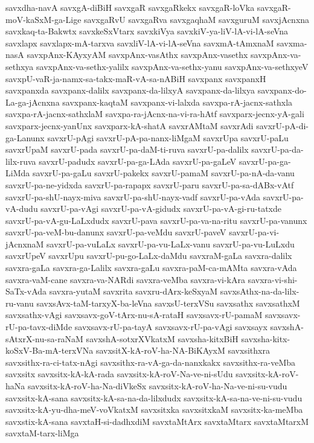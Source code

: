{savxdha-navA
savxgA-diBiH
savxgaR
savxgaRkekx
savxgaR-loVka
savxgaR-moV-kaSxM-ga-Lige
savxgaRvU
savxgaRva
savxgaqhaM
savxguruM
savxjAcnxna
savxkaq-ta-Bakwtx
savxkeSxVtarx
savxkiVya
savxkiV-ya-liV-lA-vi-lA-seVna
savxlapx
savxlapx-mA-tarxva
savxliV-lA-vi-lA-seVna
savxmA-tAmxnaM
savxma-nasA
savxpAnx-KAyxyAM
savxpAnx-vasAthx
savxpAnx-vasethx
savxpAnx-va-sethxya
savxpAnx-va-sethx-yalilx
savxpAnx-va-sethx-yanu
savxpAnx-va-sethxyeV
savxpU-vaR-ja-namx-sa-takx-maR-vA-sa-nABiH
savxpanx
savxpanxH
savxpanxda
savxpanx-dalilx
savxpanx-da-lilxyA
savxpanx-da-lilxya
savxpanx-do-La-ga-jAcnxna
savxpanx-kaqtaM
savxpanx-vi-lalxda
savxpa-rA-jacnx-sathxla
savxpa-rA-jacnx-sathxlaM
savxpa-ra-jAcnx-na-vi-ra-hAtf
savxparx-jecnx-yA-gali
savxparx-jecnx-yanUnx
savxparx-kA-shatA
savxrAMtaM
savxrAdi
savxrU-pA-di-ga-Lanunx
savxrU-pAgi
savxrU-pA-pa-nanx-liMgaM
savxrUpa
savxrU-paLu
savxrUpaM
savxrU-pada
savxrU-pa-daM-ti-ruva
savxrU-pa-dalilx
savxrU-pa-da-lilx-ruva
savxrU-padudx
savxrU-pa-ga-LAda
savxrU-pa-gaLeV
savxrU-pa-ga-LiMda
savxrU-pa-gaLu
savxrU-pakekx
savxrU-pamaM
savxrU-pa-nA-da-vanu
savxrU-pa-ne-yidxda
savxrU-pa-rapapx
savxrU-paru
savxrU-pa-sa-dABx-vAtf
savxrU-pa-shU-nayx-miva
savxrU-pa-shU-nayx-vadf
savxrU-pa-vAda
savxrU-pa-vA-dudu
savxrU-pa-vAgi
savxrU-pa-vA-gidudx
savxrU-pa-vA-gi-ru-tatxde
savxrU-pa-vA-gu-LaLxdudx
savxrU-pava
savxrU-pa-va-na-ritu
savxrU-pa-vanunx
savxrU-pa-veM-bu-danunx
savxrU-pa-veMdu
savxrU-paveV
savxrU-pa-vi-jAcnxnaM
savxrU-pa-vuLaLx
savxrU-pa-vu-LaLx-vanu
savxrU-pa-vu-LuLxdu
savxrUpeV
savxrUpu
savxrU-pu-go-LaLx-daMdu
savxraM-gaLa
savxra-dalilx
savxra-gaLa
savxra-ga-Lalilx
savxra-gaLu
savxra-paM-ca-mAMta
savxra-vAda
savxra-vaM-cane
savxra-va-NARdi
savxra-veMba
savxra-vi-kAra
savxra-vi-shi-SaTx-vAda
savxra-yutaM
savxrita
savxru-dArx-keSxyaM
savxsAthx-na-da-lilx-ru-vanu
savxsAvx-taM-tarxyX-ba-leVna
savxsU-terxVSu
savxsathx
savxsathxM
savxsathx-vAgi
savxsavx-goV-tArx-nu-sA-rataH
savxsavx-rU-pamaM
savxsavx-rU-pa-tavx-diMde
savxsavx-rU-pa-tayA
savxsavx-rU-pa-vAgi
savxsayx
savxshA-sAtxrX-nu-sa-raNaM
savxshA-sotxrXVkatxM
savxsha-kitxBiH
savxsha-kitx-koSxV-Ba-mA-terxVNa
savxsitX-kA-roV-ha-NA-BiKAyxM
savxsithxra
savxsithx-ra-ci-tatx-nAgi
savxsithx-ra-vA-ga-da-nanxkakx
savxsithx-ra-veMba
savxsitx
savxsitx-kA-kA-rada
savxsitx-kA-roV-Na-ve-ni-sUdu
savxsitx-kA-roV-haNa
savxsitx-kA-roV-ha-Na-diVkeSx
savxsitx-kA-roV-ha-Na-ve-ni-su-vudu
savxsitx-kA-sana
savxsitx-kA-sa-na-da-lilxdudx
savxsitx-kA-sa-na-ve-ni-su-vudu
savxsitx-kA-yu-dha-meV-voVkatxM
savxsitxka
savxsitxkaM
savxsitx-ka-meMba
savxstix-kA-sana
savxtaH-si-dadhxdiM
savxtaMtArx
savxtaMtarx
savxtaMtarxM
savxtaM-tarx-liMga
}
